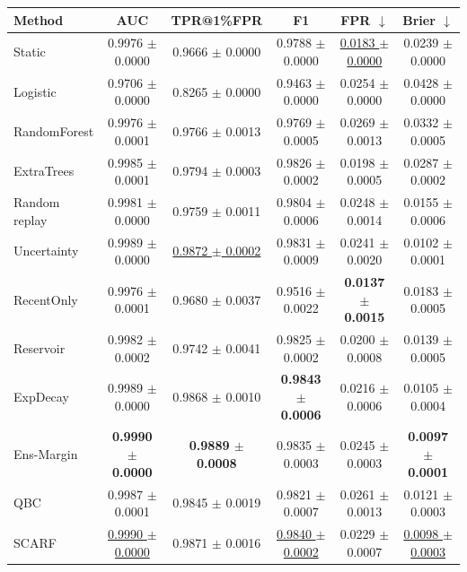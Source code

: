 \begin{tabular}{lccccc}
\toprule
Method & AUC & TPR@1\%FPR & F1 & FPR $\downarrow$ & Brier $\downarrow$ \\
\midrule
Static & 0.9976 $\pm$ 0.0000 & 0.9666 $\pm$ 0.0000 & 0.9788 $\pm$ 0.0000 & \underline{0.0183 $\pm$ 0.0000} & 0.0239 $\pm$ 0.0000 \\
Logistic & 0.9706 $\pm$ 0.0000 & 0.8265 $\pm$ 0.0000 & 0.9463 $\pm$ 0.0000 & 0.0254 $\pm$ 0.0000 & 0.0428 $\pm$ 0.0000 \\
RandomForest & 0.9976 $\pm$ 0.0001 & 0.9766 $\pm$ 0.0013 & 0.9769 $\pm$ 0.0005 & 0.0269 $\pm$ 0.0013 & 0.0332 $\pm$ 0.0005 \\
ExtraTrees & 0.9985 $\pm$ 0.0001 & 0.9794 $\pm$ 0.0003 & 0.9826 $\pm$ 0.0002 & 0.0198 $\pm$ 0.0005 & 0.0287 $\pm$ 0.0002 \\
Random replay & 0.9981 $\pm$ 0.0000 & 0.9759 $\pm$ 0.0011 & 0.9804 $\pm$ 0.0006 & 0.0248 $\pm$ 0.0014 & 0.0155 $\pm$ 0.0006 \\
Uncertainty & 0.9989 $\pm$ 0.0000 & \underline{0.9872 $\pm$ 0.0002} & 0.9831 $\pm$ 0.0009 & 0.0241 $\pm$ 0.0020 & 0.0102 $\pm$ 0.0001 \\
RecentOnly & 0.9976 $\pm$ 0.0001 & 0.9680 $\pm$ 0.0037 & 0.9516 $\pm$ 0.0022 & \textbf{0.0137 $\pm$ 0.0015} & 0.0183 $\pm$ 0.0005 \\
Reservoir & 0.9982 $\pm$ 0.0002 & 0.9742 $\pm$ 0.0041 & 0.9825 $\pm$ 0.0002 & 0.0200 $\pm$ 0.0008 & 0.0139 $\pm$ 0.0005 \\
ExpDecay & 0.9989 $\pm$ 0.0000 & 0.9868 $\pm$ 0.0010 & \textbf{0.9843 $\pm$ 0.0006} & 0.0216 $\pm$ 0.0006 & 0.0105 $\pm$ 0.0004 \\
Ens-Margin & \textbf{0.9990 $\pm$ 0.0000} & \textbf{0.9889 $\pm$ 0.0008} & 0.9835 $\pm$ 0.0003 & 0.0245 $\pm$ 0.0003 & \textbf{0.0097 $\pm$ 0.0001} \\
QBC & 0.9987 $\pm$ 0.0001 & 0.9845 $\pm$ 0.0019 & 0.9821 $\pm$ 0.0007 & 0.0261 $\pm$ 0.0013 & 0.0121 $\pm$ 0.0003 \\
SCARF & \underline{0.9990 $\pm$ 0.0000} & 0.9871 $\pm$ 0.0016 & \underline{0.9840 $\pm$ 0.0002} & 0.0229 $\pm$ 0.0007 & \underline{0.0098 $\pm$ 0.0003} \\
\bottomrule
\end{tabular}
